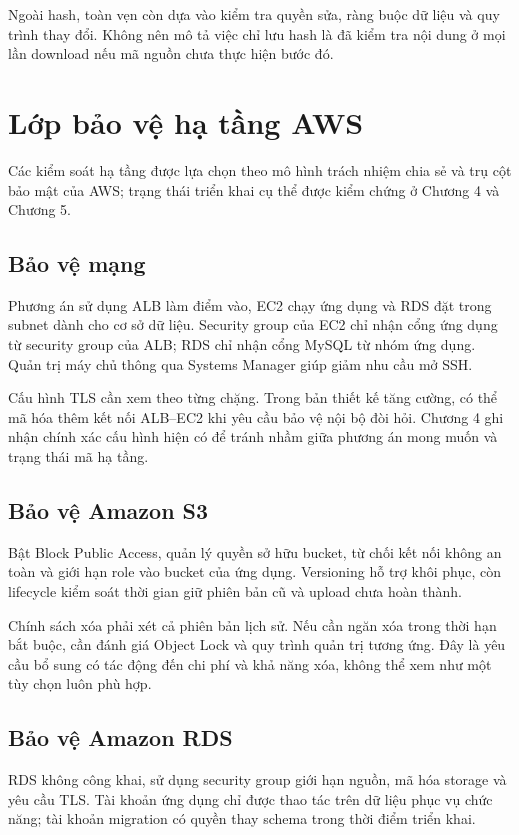 Ngoài hash, toàn vẹn còn dựa vào kiểm tra quyền sửa, ràng buộc dữ liệu và quy trình thay đổi. Không nên mô tả việc chỉ lưu hash là đã kiểm tra nội dung ở mọi lần download nếu mã nguồn chưa thực hiện bước đó.

\section{Lớp bảo vệ hạ tầng AWS}
Các kiểm soát hạ tầng được lựa chọn theo mô hình trách nhiệm chia sẻ và trụ cột bảo mật của AWS; trạng thái triển khai cụ thể được kiểm chứng ở Chương 4 và Chương 5.\cite{shared,pillar}
\subsection{Bảo vệ mạng}
Phương án sử dụng ALB làm điểm vào, EC2 chạy ứng dụng và RDS đặt trong subnet dành cho cơ sở dữ liệu. Security group của EC2 chỉ nhận cổng ứng dụng từ security group của ALB; RDS chỉ nhận cổng MySQL từ nhóm ứng dụng. Quản trị máy chủ thông qua Systems Manager giúp giảm nhu cầu mở SSH.

Cấu hình TLS cần xem theo từng chặng. Trong bản thiết kế tăng cường, có thể mã hóa thêm kết nối ALB--EC2 khi yêu cầu bảo vệ nội bộ đòi hỏi. Chương 4 ghi nhận chính xác cấu hình hiện có để tránh nhầm giữa phương án mong muốn và trạng thái mã hạ tầng.
\subsection{Bảo vệ Amazon S3}
Bật Block Public Access, quản lý quyền sở hữu bucket, từ chối kết nối không an toàn và giới hạn role vào bucket của ứng dụng. Versioning hỗ trợ khôi phục, còn lifecycle kiểm soát thời gian giữ phiên bản cũ và upload chưa hoàn thành.

Chính sách xóa phải xét cả phiên bản lịch sử. Nếu cần ngăn xóa trong thời hạn bắt buộc, cần đánh giá Object Lock và quy trình quản trị tương ứng. Đây là yêu cầu bổ sung có tác động đến chi phí và khả năng xóa, không thể xem như một tùy chọn luôn phù hợp.
\subsection{Bảo vệ Amazon RDS}
RDS không công khai, sử dụng security group giới hạn nguồn, mã hóa storage và yêu cầu TLS. Tài khoản ứng dụng chỉ được thao tác trên dữ liệu phục vụ chức năng; tài khoản migration có quyền thay schema trong thời điểm triển khai.

